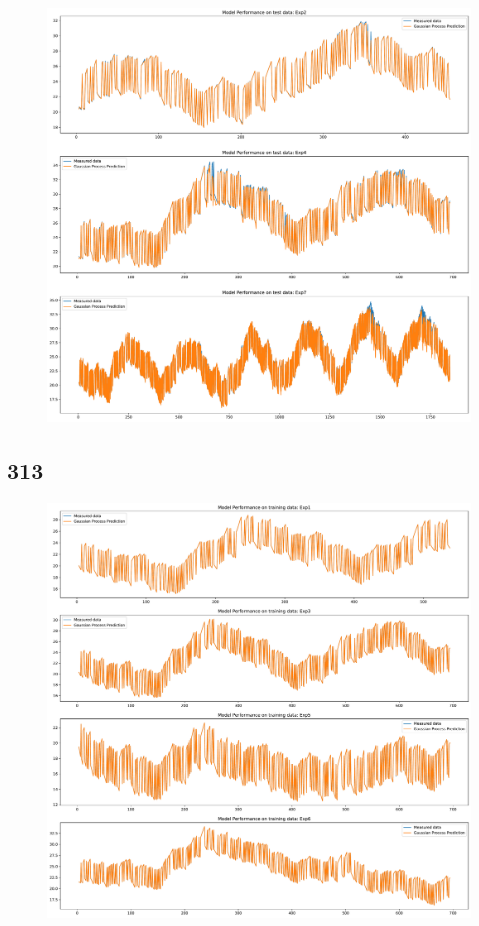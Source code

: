 \begin{figure}[ht]
    \centering
    \includegraphics[width = \textwidth]{Plots/GP_213_test_performance.pdf}
    \caption{}
    \label{fig:GP_213_test_validation}
\end{figure}

\clearpage

\subsection{313}

\begin{figure}[ht]
    \centering
    \includegraphics[width = \textwidth]{Plots/GP_313_training_performance.pdf}
    \caption{}
    \label{fig:GP_313_train_validation}
\end{figure}

